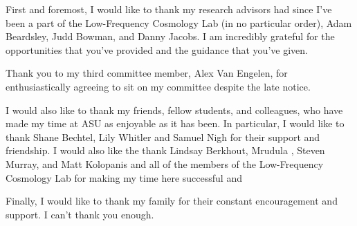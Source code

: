 First and foremost, I would like to thank my research advisors had since
I've been a part of the Low-Frequency Cosmology Lab (in no particular order), Adam Beardsley, Judd Bowman,
and Danny Jacobs. I am incredibly grateful for the opportunities that you've provided
and the guidance that you've given.

Thank you to my third committee member, Alex Van Engelen, for enthusiastically
agreeing to sit on my committee despite the late notice.

I would also like to thank my friends, fellow students, and colleagues,
who have made my time at ASU as enjoyable as it has been. In particular, I would like to
thank Shane Bechtel, Lily Whitler and Samuel Nigh for their support and friendship.
I would also like the thank Lindsay Berkhout, Mrudula , Steven Murray, and Matt Kolopanis and all of the members of the Low-Frequency
Cosmology Lab for making my time here successful and

Finally, I would like to thank my family for their constant encouragement and support.
I can't thank you enough.
\clearpage
